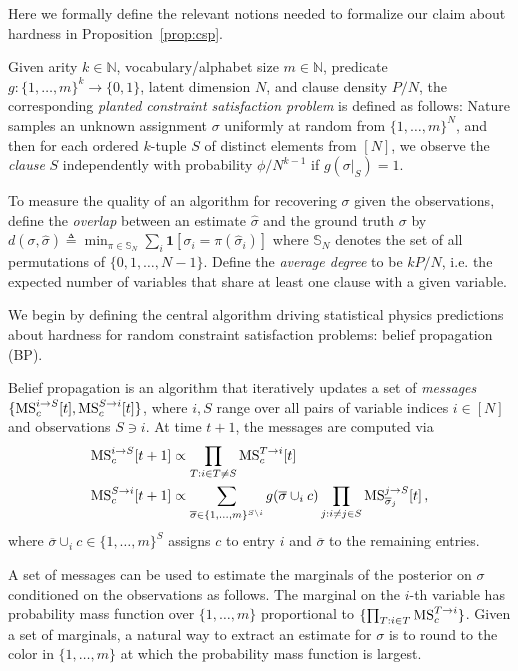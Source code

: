 Here we formally define the relevant notions needed to formalize our claim about hardness in Proposition~\ref{prop:csp}.

\begin{definition}\label{def:plantedcsp}
    Given arity $k\in\mathbb{N}$, vocabulary/alphabet size $m\in\mathbb{N}$, predicate $g: \{1,\ldots,m\}^k \to \{0,1\}$, latent dimension $N$, and clause density $P/N$, the corresponding \emph{planted constraint satisfaction problem} is defined as follows: Nature samples an unknown assignment $\sigma$ uniformly at random from $\{ 1, \ldots, m \}^N$, and then for each ordered $k$-tuple $S$ of distinct elements from $[N]$, we observe the \emph{clause} $S$ independently with probability $\phi / N^{k-1}$ if $g(\sigma|_S) = 1$.

    To measure the quality of an algorithm for recovering $\sigma$ given the observations, define the \emph{overlap} between an estimate $\hat{\sigma}$ and the ground truth $\sigma$ by $d(\sigma,\hat{\sigma}) \triangleq \min_{\pi\in\mathbb{S}_N} \sum_i \mathbf{1}[\sigma_i = \pi(\hat{\sigma}_i)]$ where $\mathbb{S}_N$ denotes the set of all permutations of $\{0, 1, \ldots, N-1\}$. Define the \emph{average degree} to be $kP/N$, i.e. the expected number of variables that share at least one clause with a given variable.
\end{definition}

We begin by defining the central algorithm driving statistical physics predictions about hardness for random constraint satisfaction problems: belief propagation (BP).



\begin{definition}\label{def:BP}
    Belief propagation is an algorithm that iteratively updates a set of \emph{messages} $\{\textrm{MS}^{i\to S}_c[t], \textrm{MS}^{S\to i}_c[t]\}$, where $i, S$ range over all pairs of variable indices $i\in[N]$ and observations $S\ni i$. At time $t+1$, the messages are computed via
    \begin{align}
        \textrm{MS}^{i\to S}_c[t+1] &\propto \prod_{T: i\in T\neq S} \textrm{MS}^{T\to i}_c[t] \\
        \textrm{MS}^{S\to i}_c[t+1] & \propto \sum_{\overline{\sigma}\in \{ 1,\ldots,m \}^{S\backslash i}} g(\overline{\sigma}\cup_i c) \prod_{j: i\neq j\in S} \textrm{MS}^{j\to S}_{\overline{\sigma}_j}[t]\,,
    \end{align}
    where $\overline{\sigma}\cup_i c \in \{1, \ldots, m \}^S$ assigns $c$ to entry $i$ and $\overline{\sigma}$ to the remaining entries.

    A set of messages can be used to estimate the marginals of the posterior on $\sigma$ conditioned on the observations as follows. The marginal on the $i$-th variable has probability mass function over $\{1, \ldots, m\}$ proportional to $\{\prod_{T: i\in T} \textrm{MS}^{T\to i}_c\}$. Given a set of marginals, a natural way to extract an estimate for $\sigma$ is to round to the color in $\{1, \ldots, m\}$ at which the probability mass function is largest.
\end{definition}


